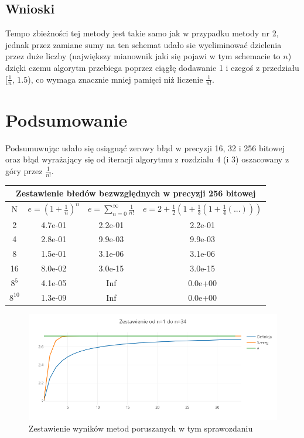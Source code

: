 \documentclass{article}
\begin{document}
\subsection{Wnioski}
Tempo zbieżności tej metody jest takie samo jak w przypadku metody nr 2, jednak przez zamiane sumy na ten schemat udało sie wyeliminować dzielenia przez duże liczby (największy mianownik jaki się pojawi w tym schemacie to $n$) dzięki czemu algorytm przebiega poprzez ciągłę dodawanie 1 i czegoś z przedziału [$\frac{1}{n}$, $1.5$), co wymaga znacznie mniej pamięci niż liczenie $\frac{1}{n!}$.
\newpage
\section{Podsumowanie}
Podsumuwując udało się osiągnąć zerowy błąd w precyzji 16, 32 i 256 bitowej oraz błąd wyrażający się od iteracji algorytmu z rozdzialu 4 (i 3) oszacowany z góry przez $\frac{1}{n!}$.
\newline
\newline
\begin{center}
\begin{tabular}{||c||c|c|c||} \hline
\multicolumn{4}{||c||}{Zestawienie błedów bezwzględnych w precyzji 256 bitowej} \\ \hline
N & $e=(1+\frac{1}{n})^{n}$ & $e = \sum_{n=0}^{\infty} \frac{1}{n!}$ & $e = 2 + \frac{1}{2}(1 + \frac{1}{3}(1+ \frac{1}{4}(...)))$\\ 
\hline
2 & 4.7e-01  & 2.2e-01  & 2.2e-01\\
\hline
4 & 2.8e-01  & 9.9e-03  & 9.9e-03\\
\hline
8 & 1.5e-01  & 3.1e-06  & 3.1e-06\\
\hline
16 & 8.0e-02 & 3.0e-15  & 3.0e-15\\
\hline
$8^5$ & 4.1e-05  & Inf  & 0.0e+00\\
\hline
$8^{10}$ & 1.3e-09 & Inf  & 0.0e+00\\
\hline
\end{tabular}
\end{center}
\begin{figure}[ht]
  \begin{center}
  \includegraphics[width=15cm]{z}
  \end{center}
  \caption{Zestawienie wyników metod poruszanych w tym sprawozdaniu}
  \label{fig:rysunek3}
\end{figure}
\end{document}
